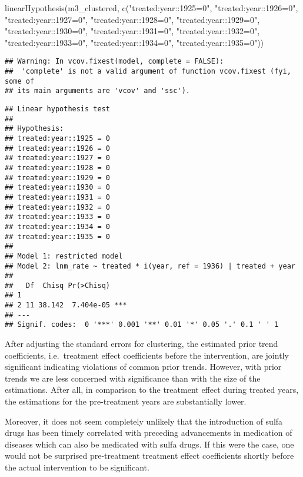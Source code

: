 \documentclass[
]{article}
\newenvironment{Shaded}{\begin{snugshade}}{\end{snugshade}}
\newcommand{\FunctionTok}[1]{\textcolor[rgb]{0.00,0.00,0.00}{#1}}
\newcommand{\NormalTok}[1]{#1}
\newcommand{\StringTok}[1]{\textcolor[rgb]{0.31,0.60,0.02}{#1}}
\begin{document}
\begin{Shaded}
\begin{Highlighting}[]
\FunctionTok{linearHypothesis}\NormalTok{(m3\_clustered, }\FunctionTok{c}\NormalTok{(}\StringTok{"treated:year::1925=0"}\NormalTok{, }\StringTok{"treated:year::1926=0"}\NormalTok{, }\StringTok{"treated:year::1927=0"}\NormalTok{, }\StringTok{"treated:year::1928=0"}\NormalTok{, }
                                  \StringTok{"treated:year::1929=0"}\NormalTok{, }\StringTok{"treated:year::1930=0"}\NormalTok{, }\StringTok{"treated:year::1931=0"}\NormalTok{, }\StringTok{"treated:year::1932=0"}\NormalTok{, }\StringTok{"treated:year::1933=0"}\NormalTok{, }\StringTok{"treated:year::1934=0"}\NormalTok{, }\StringTok{"treated:year::1935=0"}\NormalTok{))}
\end{Highlighting}
\end{Shaded}

\begin{verbatim}
## Warning: In vcov.fixest(model, complete = FALSE):
##  'complete' is not a valid argument of function vcov.fixest (fyi, some of
## its main arguments are 'vcov' and 'ssc').
\end{verbatim}

\begin{verbatim}
## Linear hypothesis test
## 
## Hypothesis:
## treated:year::1925 = 0
## treated:year::1926 = 0
## treated:year::1927 = 0
## treated:year::1928 = 0
## treated:year::1929 = 0
## treated:year::1930 = 0
## treated:year::1931 = 0
## treated:year::1932 = 0
## treated:year::1933 = 0
## treated:year::1934 = 0
## treated:year::1935 = 0
## 
## Model 1: restricted model
## Model 2: lnm_rate ~ treated * i(year, ref = 1936) | treated + year
## 
##   Df  Chisq Pr(>Chisq)    
## 1                         
## 2 11 38.142  7.404e-05 ***
## ---
## Signif. codes:  0 '***' 0.001 '**' 0.01 '*' 0.05 '.' 0.1 ' ' 1
\end{verbatim}

After adjusting the standard errors for clustering, the estimated prior
trend coefficients, i.e.~treatment effect coefficients before the
intervention, are jointly significant indicating violations of common
prior trends. However, with prior trends we are less concerned with
significance than with the size of the estimations. After all, in
comparison to the treatment effect during treated years, the estimations
for the pre-treatment years are substantially lower.

Moreover, it does not seem completely unlikely that the introduction of
sulfa drugs has been timely correlated with preceding advancements in
medication of diseases which can also be medicated with sulfa drugs. If
this were the case, one would not be surprised pre-treatment treatment
effect coefficients shortly before the actual intervention to be
significant.
\end{document}
